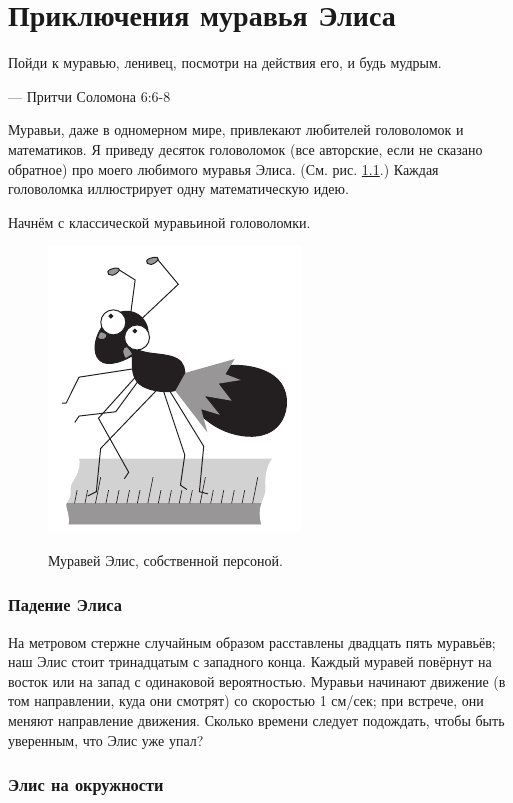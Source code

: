 \chapter{Приключения муравья Элиса}


\setlength{\epigraphwidth}{.67\textwidth}
\epigraph{Пойди к муравью, ленивец, посмотри на действия его, и будь мудрым.
}{--- Притчи Соломона 6:6-8} 

Муравьи, даже в одномерном мире, привлекают любителей головоломок и математиков.
Я приведу десяток головоломок (все авторские, если не сказано обратное) про моего любимого муравья Элиса.
(См. рис. \ref{pic:alice1}.)
Каждая головоломка иллюстрирует одну математическую идею.

Начнём с классической муравьиной головоломки.

\begin{figure}[h!]
\centering
\includegraphics[scale=.5]{pics/alice1}
\label{pic:alice1}
\caption{Муравей Элис, собственной персоной.}
\end{figure}

\subsection*{Падение Элиса}

На метровом стержне случайным образом расставлены двадцать пять муравьёв; наш Элис стоит тринадцатым с западного конца.
Каждый муравей повёрнут на восток или на запад с одинаковой вероятностью.
Муравьи начинают движение (в том направлении, куда они смотрят) со скоростью 1 см/сек;
при встрече, они меняют направление движения.
Сколько времени следует подождать, чтобы быть уверенным, что Элис уже упал?

\subsection*{Элис на окружности}

